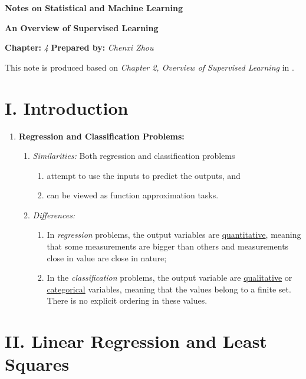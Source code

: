 \documentclass[12pt]{article}
\newcommand{\titlebox}[4]{
\begin{tcolorbox}[colback = blue!5!white!95, colframe = blue!70!black
]
  \noindent \textbf{ #1 } \hfill \textit{#2} 
  \begin{center}
  	 \LARGE{\textbf{#3}}
  \end{center}
\textbf{Chapter:} \textit{#4} \hfill \textbf{Prepared by:} \textit{Chenxi Zhou}
\end{tcolorbox}
}
\begin{document}
\titlebox{Notes on Statistical and Machine Learning}{}{An Overview of Supervised Learning}{4}
\thispagestyle{plain}

\vspace{10pt}

This note is produced based on \textit{Chapter 2, Overview of Supervised Learning} in \textcite{Friedman2001-np}. 

\section*{I. Introduction}


\begin{enumerate}[label=\textbf{\arabic*.}]
	
	\item \textbf{Regression and Classification Problems:} 
	\begin{enumerate}
		\item \textit{Similarities:} Both regression and classification problems
		\begin{enumerate}
			\item attempt to use the inputs to predict the outputs, and 
			\item can be viewed as function approximation tasks. 
		\end{enumerate}
		\item \textit{Differences:} 
		\begin{enumerate}
			\item In \emph{regression} problems, the output variables are \underline{quantitative}, meaning that some measurements are bigger than others and measurements close in value are close in nature; 
			\item In the \emph{classification} problems, the output variable are \underline{qualitative} or \underline{categorical} variables, meaning that the values belong to a finite set. There is no explicit ordering in these values. 
		\end{enumerate}
	\end{enumerate}
	
\end{enumerate}


\section*{II. Linear Regression and Least Squares}
\end{document}
